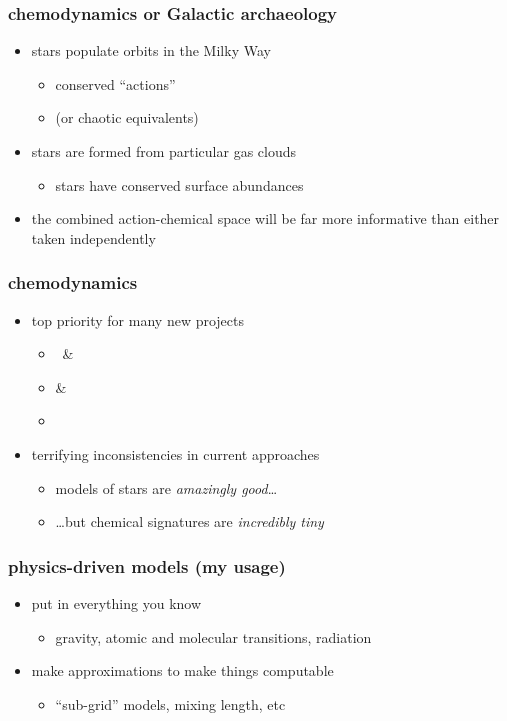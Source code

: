 \documentclass[pdftex]{beamer}
\begin{document}
\begin{frame}
  \frametitle{chemodynamics or Galactic archaeology}
  \begin{itemize}
  \item stars populate orbits in the Milky Way
    \begin{itemize}
    \item conserved ``actions''
    \item (or chaotic equivalents)
    \end{itemize}
  \item stars are formed from particular gas clouds
    \begin{itemize}
    \item stars have conserved surface abundances
    \end{itemize}
  \item the combined action-chemical space will be far more
    informative than either taken independently
  \end{itemize}
\end{frame}

\begin{frame}
  \frametitle{chemodynamics}
  \begin{itemize}
  \item top priority for many new projects
    \begin{itemize}
    \item \gaia\ \& 
    \item {} \& 
    \item \sdssiii\ \apogee
    \end{itemize}
  \item terrifying inconsistencies in current approaches
    \begin{itemize}
    \item models of stars are \emph{amazingly good}\ldots
    \item \ldots but chemical signatures are \emph{incredibly tiny}
    \end{itemize}
  \end{itemize}
\end{frame}

\begin{frame}
  \frametitle{physics-driven models (my usage)}
  \begin{itemize}
  \item put in everything you know
    \begin{itemize}
    \item gravity, atomic and molecular transitions, radiation
    \end{itemize}
  \item make approximations to make things computable
    \begin{itemize}
    \item ``sub-grid'' models, mixing length, etc
    \end{itemize}
  \end{itemize}
\end{frame}
\end{document}
